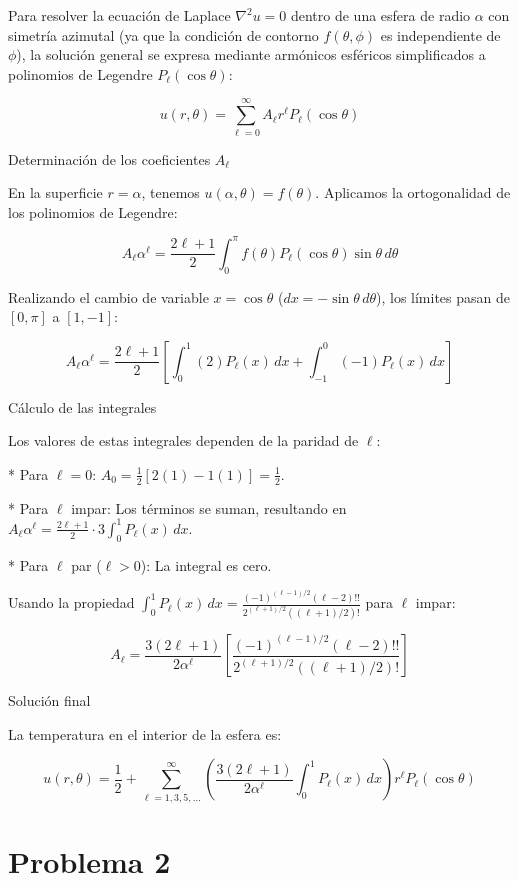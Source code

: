 \documentclass[a4paper]{article}
\begin{document}
Para resolver la ecuación de Laplace $\nabla^2 u = 0$ dentro de una esfera de radio $\alpha$ con simetría azimutal (ya que la condición de contorno $f(\theta, \phi)$ es independiente de $\phi$), la solución general se expresa mediante armónicos esféricos simplificados a polinomios de Legendre $P_\ell(\cos\theta)$:

$$u(r, \theta) = \sum_{\ell=0}^{\infty} A_\ell r^\ell P_\ell(\cos\theta)$$

Determinación de los coeficientes $A_\ell$

En la superficie $r = \alpha$, tenemos $u(\alpha, \theta) = f(\theta)$. Aplicamos la ortogonalidad de los polinomios de Legendre:

$$A_\ell \alpha^\ell = \frac{2\ell+1}{2} \int_{0}^{\pi} f(\theta) P_\ell(\cos\theta) \sin\theta \, d\theta$$

Realizando el cambio de variable $x = \cos\theta$ ($dx = -\sin\theta \, d\theta$), los límites pasan de $[0, \pi]$ a $[1, -1]$:

$$A_\ell \alpha^\ell = \frac{2\ell+1}{2} \left[ \int_{0}^{1} (2) P_\ell(x) \, dx + \int_{-1}^{0} (-1) P_\ell(x) \, dx \right]$$

Cálculo de las integrales

Los valores de estas integrales dependen de la paridad de $\ell$:

* Para $\ell = 0$: $A_0 = \frac{1}{2} [2(1) - 1(1)] = \frac{1}{2}$.

* Para $\ell$ impar: Los términos se suman, resultando en $A_\ell \alpha^\ell = \frac{2\ell+1}{2} \cdot 3 \int_{0}^{1} P_\ell(x) \, dx$.

* Para $\ell$ par ($\ell > 0$): La integral es cero.

Usando la propiedad $\int_{0}^{1} P_\ell(x) \, dx = \frac{(-1)^{(\ell-1)/2} (\ell-2)!!}{2^{(\ell+1)/2} ((\ell+1)/2)!}$ para $\ell$ impar:

$$A_\ell = \frac{3(2\ell+1)}{2 \alpha^\ell} \left[ \frac{(-1)^{(\ell-1)/2} (\ell-2)!!}{2^{(\ell+1)/2} ((\ell+1)/2)!} \right]$$

Solución final

La temperatura en el interior de la esfera es:

$$u(r, \theta) = \frac{1}{2} + \sum_{\ell=1, 3, 5, \dots}^{\infty} \left( \frac{3(2\ell+1)}{2 \alpha^\ell} \int_{0}^{1} P_\ell(x) \, dx \right) r^\ell P_\ell(\cos\theta)$$

\section{Problema 2}
\end{document}
